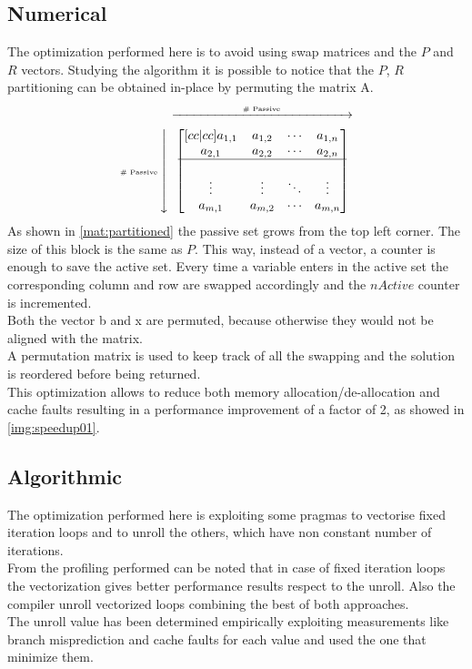 \subsection{Numerical}
The optimization performed here is to avoid using swap matrices and the $P$ and $R$ vectors. Studying the algorithm it is possible to notice that the $P$, $R$ partitioning can be obtained in-place by permuting the matrix A.
\begin{equation}
  \label{mat:partitioned}
  \text{\tiny \# Passive}\mymatrix{\begin{bmatrix}[cc|cc]
    a_{1,1} & a_{1,2} & \cdots & a_{1,n} \\
    a_{2,1} & a_{2,2} & \cdots & a_{2,n} \\
    \hline \\
    \vdots  & \vdots  & \ddots & \vdots  \\
    a_{m,1} & a_{m,2} & \cdots & a_{m,n}
  \end{bmatrix}}
\end{equation}
As shown in \ref{mat:partitioned} the passive set grows from the top left corner. The size of this block is the same as $P$. This way, instead of a vector, a counter is enough to save the active set. Every time a variable enters in the active set the corresponding column and row are swapped accordingly and the $nActive$ counter is incremented. \\
Both the vector b and x are permuted, because otherwise they would not be aligned with the matrix. \\
A permutation matrix is used to keep track of all the swapping and the solution is reordered before being returned. \\
This optimization allows to reduce both memory allocation/de-allocation and cache faults resulting in a performance improvement of a factor of 2, as showed in \ref{img:speedup01}.
\subsection{Algorithmic}
The optimization performed here is exploiting some pragmas to vectorise fixed iteration loops and to unroll the others, which have non constant number  of iterations. \\
From the profiling performed can be noted that in case of fixed iteration loops the vectorization gives better performance results respect to the unroll. Also the compiler unroll vectorized loops combining the best of both approaches. \\
The unroll value has been determined empirically exploiting measurements like branch misprediction and cache faults for each value and used the one that minimize them.\\